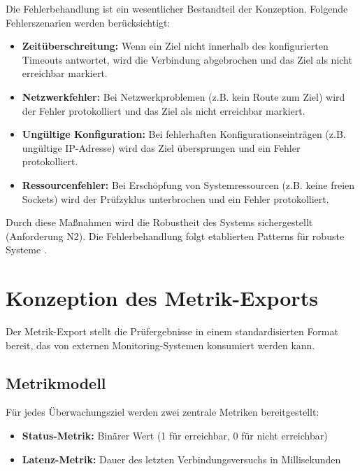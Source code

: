 Die Fehlerbehandlung ist ein wesentlicher Bestandteil der Konzeption. Folgende Fehlerszenarien werden berücksichtigt:

\begin{itemize}
    \item \textbf{Zeitüberschreitung:} Wenn ein Ziel nicht innerhalb des konfigurierten Timeouts antwortet, wird die Verbindung abgebrochen und das Ziel als nicht erreichbar markiert.
    \item \textbf{Netzwerkfehler:} Bei Netzwerkproblemen (z.B. kein Route zum Ziel) wird der Fehler protokolliert und das Ziel als nicht erreichbar markiert.
    \item \textbf{Ungültige Konfiguration:} Bei fehlerhaften Konfigurationseinträgen (z.B. ungültige IP-Adresse) wird das Ziel übersprungen und ein Fehler protokolliert.
    \item \textbf{Ressourcenfehler:} Bei Erschöpfung von Systemressourcen (z.B. keine freien Sockets) wird der Prüfzyklus unterbrochen und ein Fehler protokolliert.
\end{itemize}

Durch diese Maßnahmen wird die Robustheit des Systems sichergestellt (Anforderung N2). Die Fehlerbehandlung folgt etablierten Patterns für robuste Systeme \cite{error-handling-patterns}.

\section{Konzeption des Metrik-Exports}
\label{sec:konzeption-metrik-export}

Der Metrik-Export stellt die Prüfergebnisse in einem standardisierten Format bereit, das von externen Monitoring-Systemen konsumiert werden kann.

\subsection{Metrikmodell}
\label{subsec:metrikmodell}

Für jedes Überwachungsziel werden zwei zentrale Metriken bereitgestellt:

\begin{itemize}
    \item \textbf{Status-Metrik:} Binärer Wert (1 für erreichbar, 0 für nicht erreichbar)
    \item \textbf{Latenz-Metrik:} Dauer des letzten Verbindungsversuchs in Millisekunden
\end{itemize}

